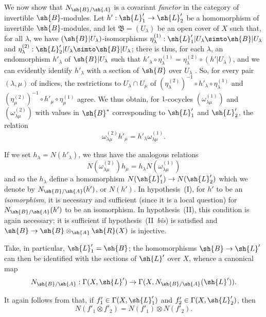 \begin{env}[6.5.3]
\label{II.6.5.3}
We now show that $N_{\sh{B}/\sh{A}}$ is a covariant \emph{functor} in the category of invertible $\sh{B}$-modules.
Let $h':\sh{L}'_1\to\sh{L}'_2$ be a homomorphism of invertible $\sh{B}$-modules, and let $\mathfrak{B}=(U_\lambda)$ be an open cover of $X$ such that, for all $\lambda$, we have $(\sh{B}|U_\lambda)$-isomorphisms $\eta_\lambda^{(1)}:\sh{L}'_1|U_\lambda\simto\sh{B}|U_\lambda$ and $\eta_\lambda^{(2)}:\sh{L}'_2|U_\lambda\simto\sh{B}|U_\lambda$;
there is thus, for each $\lambda$, an endomorphism $h'_\lambda$ of $\sh{B}|U_\lambda$ such that $h'_\lambda\circ\eta_\lambda^{(1)}=\eta_\lambda^{(2)}\circ(h'|U_\lambda)$, and we can evidently identify $h'_\lambda$ with a section of $\sh{B}$ over $U_\lambda$ .
So, for every pair $(\lambda,\mu)$ of indices, the restrictions to $U_\lambda\cap U_\mu$ of $(\eta_\lambda^{(2)})^{-1}\circ h'_\lambda\circ\eta_\lambda^{(1)}$ and $(\eta_\mu^{(2)})^{-1}\circ h'_\mu\circ\eta_\mu^{(1)}$ agree.
We thus obtain, for $1$-cocycles $(\omega_{\lambda\mu}^{(1)})$ and $(\omega_{\lambda\mu}^{(2)})$ with values in $\sh{B}^*$ corresponding to $\sh{L}'_1$ and $\sh{L}'_2$, the relation
\[
  \omega_{\lambda\mu}^{(2)}h'_\mu = h'_\lambda\omega_{\lambda\mu}^{(1)}.
\]

If we set $h_\lambda=N(h'_\lambda)$, we thus have the analogous relations
\[
  N(\omega_{\lambda\mu}^{(2)})h_\mu = h_\lambda N(\omega_{\lambda\mu}^{(1)})
\]
and so the $h_\lambda$ define a homomorphism $N(\sh{L}'_1)\to N(\sh{L}'_2)$ which we denote by $N_{\sh{B}/\sh{A}}(h')$, or $N(h')$.
In hypothesis~(I), for $h'$ to be an \emph{isomorphism}, it is necessary and sufficient (since it is a local question) for $N_{\sh{B}/\sh{A}}(h')$ to be an isomorphism.
In hypothesis~(II), this condition is again necessary;
it is sufficient if hypothesis~(II~\emph{bis}) is satisfied and $\sh{B}\to\sh{B}\otimes_{\sh{A}}\sh{R}(X)$ is injective.

Take, in particular, $\sh{L}'_1=\sh{B}$;
the homomorphisms $\sh{B}\to\sh{L}'$ can then be identified  with the sections of $\sh{L}'$ over $X$, whence a canonical map
\[
  N_{\sh{B}/\sh{A}} : \Gamma(X,\sh{L}')\to\Gamma(X,N_{\sh{B}/\sh{A}}(\sh{L}')).
\]

It again follows from  that, if $f'_1\in\Gamma(X,\sh{L}'_1)$ and $f'_2\in\Gamma(X,\sh{L}'_2)$, then
\[
\label{II.6.5.3.1}
  N(f'_1\otimes f'_2) = N(f'_1)\otimes N(f'_2).
\tag{6.5.3.1}
\]


\end{env}
